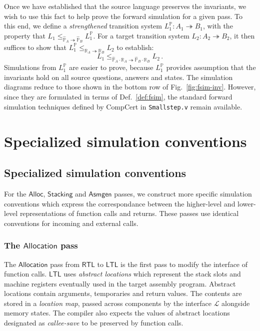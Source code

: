 \documentclass[draft,11pt]{report}
\newcommand{\kw}[1]{\ensuremath{ \mathsf{#1} }}
\begin{document}
Once we have established that
the source language preserves the invariants,
we wish to use this fact to help prove the forward simulation
for a given pass.
To this end,
we define a \emph{strengthened} transition system
$L_1^\mathbb{P} : A_1 \twoheadrightarrow B_1$,
with the property that
$
   L_1 \le_{\hat{\mathbb{P}}_A \twoheadrightarrow \hat{\mathbb{P}}_B}
   L_1^\mathbb{P}
$.
For a target transition system $L_2 : A_2 \twoheadrightarrow B_2$,
it then suffices to show that
$
  L_1^\mathbb{P}
  \le_{\mathbb{R}_A \twoheadrightarrow \mathbb{R}_B}
  L_2
$
to establish:
\[
  L_1
  \le_{\hat{\mathbb{P}}_A \cdot \mathbb{R}_A \twoheadrightarrow
       \hat{\mathbb{P}}_B \cdot \mathbb{R}_B}
  L_2 \,.
\]
Simulations from $L_1^\mathbb{P}$
are easier to prove,
because $L_1^\mathbb{P}$
provides assumption that the invariants hold
on all source questions, answers and states.
The simulation diagrams
reduce to those shown in the bottom row of
Fig.~\ref{fig:fsim-inv}.
However, since they are formulated in terms of
Def.~\ref{def:fsim},
the standard forward simulation techniques
defined by CompCert
in \texttt{Smallstep.v}
remain available.



\chapter{Specialized simulation conventions} %

\section{Specialized simulation conventions} \label{sec:backend} %

For the \kw{Alloc}, \kw{Stacking} and \kw{Asmgen} passes,
we construct more specific simulation conventions
which express the correspondance between
the higher-level and lower-level representations
of function calls and returns.
These passes use identical conventions for
incoming and external calls.

\subsection{The \kw{Allocation} pass} \label{sec:alloc} %

The \kw{Allocation} pass from \kw{RTL} to \kw{LTL}
is the first pass to modify the interface of function calls.
\kw{LTL} uses \emph{abstract locations}
which represent the stack slots and machine registers
eventually used in the target assembly program.
Abstract locations contain arguments, temporaries and return values.
The contents are stored in a \emph{location map},
passed across components by the interface $\mathcal{L}$
alongside memory states.
The compiler also expects the values of
abstract locations designated as \emph{callee-save}
to be preserved by function calls.
\end{document}
